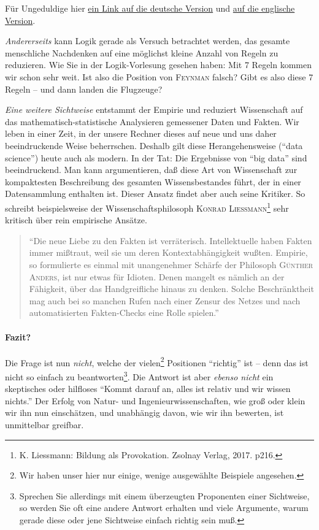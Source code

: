 Für Ungeduldige hier \hyperlink{Ank:Cargo Cult Wissenschaft}{ein Link auf die deutsche Version}
und \hyperlink{Ank:Cargo Cult Science}{auf die englische Version}.

\textit{Andererseits} kann Logik gerade als Versuch betrachtet
werden, das gesamte menschliche Nachdenken auf eine möglichst kleine
Anzahl von Regeln zu reduzieren. Wie Sie in der Logik-Vorlesung
gesehen haben: Mit 7 Regeln kommen wir schon sehr weit.
Ist also die Position von \textsc{Feynman} falsch? 
Gibt es also diese 7 Regeln -- und dann landen die Flugzeuge?

\textit{Eine weitere Sichtweise} entstammt der Empirie und reduziert
Wissenschaft auf das mathematisch-statistische Analysieren gemessener Daten
und Fakten. Wir leben in einer Zeit, in der unsere Rechner dieses auf neue und
uns daher beeindruckende Weise beherrschen. Deshalb gilt diese Herangehensweise (\enquote{data science}) 
heute auch als modern. In der Tat: Die Ergebnisse von \enquote{big data} sind beeindruckend.
Man kann argumentieren, daß diese Art von Wissenschaft zur kompaktesten Beschreibung des gesamten
Wissensbestandes führt, der in einer Datensammlung enthalten ist.
Dieser Ansatz findet aber auch seine Kritiker. So schreibt beispielsweise der Wissenschaftsphilosoph
\textsc{Konrad Liessmann}\footnote{K. Liessmann: Bildung als Provokation. Zsolnay Verlag, 2017. p216.}
sehr kritisch über rein empirische Ansätze.

{
\begin{quote}
\enquote{Die neue Liebe zu den Fakten ist verräterisch. Intellektuelle haben Fakten immer mißtraut,
weil sie um deren Kontextabhängig\-keit wußten. Empirie, so formulierte es einmal mit
unangenehmer Schärfe der Philosoph \textsc{Günther Anders}, ist nur etwas für Idioten. Denen
mangelt es nämlich an der Fähigkeit, über das Handgreifliche hinaus zu denken. Solche
Beschränktheit mag auch bei so manchen Rufen nach einer Zensur des Netzes und nach
automatisierten Fakten-Checks eine Rolle spielen.}
\end{quote}
}

\paragraph{Fazit?}
Die Frage ist nun \textit{nicht}, welche der vielen\footnote{Wir haben unser hier nur einige, wenige
ausgewählte
Beispiele angesehen.} Positionen \enquote{richtig} ist -- denn das ist nicht so einfach zu
beantworten\footnote{Sprechen Sie allerdings mit einem überzeugten Proponenten einer
Sichtweise, so werden Sie oft eine andere Antwort erhalten und viele Argumente, warum gerade diese oder
jene Sichtweise einfach richtig sein muß.}. Die Antwort ist aber \textit{ebenso nicht} ein
skeptisches oder hilfloses
\enquote{Kommt darauf an, alles ist relativ und wir wissen nichts.}
Der Erfolg von Natur- und Ingenieurwissenschaften, wie groß oder klein wir ihn nun einschätzen,
und unabhängig davon, wie wir ihn bewerten, ist unmittelbar greifbar.

